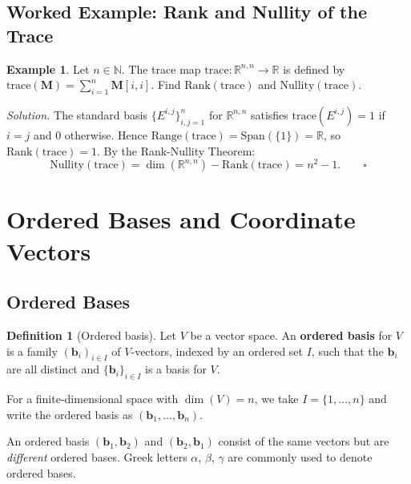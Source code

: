 \documentclass[11pt, a4paper, notitlepage]{report}
\theoremstyle{definition}
\newtheorem{definition}[theorem]{Definition}
\newtheorem{example}[theorem]{Example}
\theoremstyle{remark}
\begin{document}
\subsection{Worked Example: Rank and Nullity of the Trace}

\begin{example}\label{ex:rank-nullity-trace}
Let $n \in \mathbb{N}$. The trace map $\mathrm{trace} : \mathbb{R}^{n,n} \to \mathbb{R}$ is defined by
$\mathrm{trace}(\mathbf{M}) = \sum_{i=1}^n \mathbf{M}[i,i]$.
Find $\mathrm{Rank}(\mathrm{trace})$ and $\mathrm{Nullity}(\mathrm{trace})$.

\emph{Solution.}
The standard basis $\{E^{i,j}\}_{i,j=1}^n$ for $\mathbb{R}^{n,n}$ satisfies $\mathrm{trace}(E^{i,j}) = 1$ if $i=j$ and $0$ otherwise.
Hence $\mathrm{Range}(\mathrm{trace}) = \mathrm{Span}(\{1\}) = \mathbb{R}$, so $\mathrm{Rank}(\mathrm{trace}) = 1$.
By the Rank-Nullity Theorem:
\[
  \mathrm{Nullity}(\mathrm{trace}) = \dim(\mathbb{R}^{n,n}) - \mathrm{Rank}(\mathrm{trace}) = n^2 - 1. \qquad \square
\]
\end{example}

\section{Ordered Bases and Coordinate Vectors}
\label{sec:ordered-bases}

\subsection{Ordered Bases}

\begin{definition}[Ordered basis]\label{def:ordered-basis}
Let $V$ be a vector space. An \textbf{ordered basis} for $V$ is a family $(\mathbf{b}_i)_{i \in I}$ of
$V$-vectors, indexed by an ordered set $I$, such that the $\mathbf{b}_i$ are all distinct and
$\{\mathbf{b}_i\}_{i \in I}$ is a basis for $V$.

For a finite-dimensional space with $\dim(V) = n$, we take $I = \{1, \ldots, n\}$ and write the
ordered basis as $(\mathbf{b}_1, \ldots, \mathbf{b}_n)$.
\end{definition}

\begin{warning}[title={Warning: Order Matters}]
An ordered basis $(\mathbf{b}_1, \mathbf{b}_2)$ and $(\mathbf{b}_2, \mathbf{b}_1)$ consist of the same vectors
but are \emph{different} ordered bases. Greek letters $\alpha$, $\beta$, $\gamma$ are commonly used
to denote ordered bases.
\end{warning}
\end{document}
